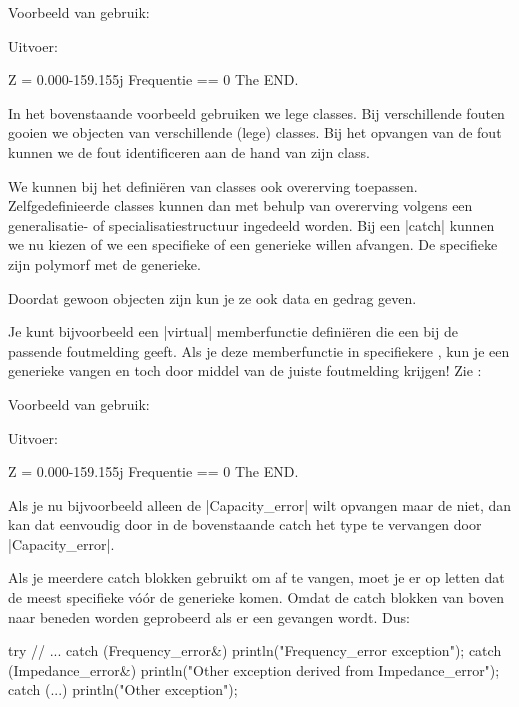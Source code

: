 \begin{cpplstShortInline}
Voorbeeld van gebruik:

Uitvoer:
\begin{coutput}
Z = 0.000-159.155j
Frequentie == 0
The END.
\end{coutput}

In het bovenstaande voorbeeld gebruiken we lege classes.
Bij verschillende fouten gooien we objecten van verschillende (lege) classes.
Bij het opvangen van de fout kunnen we de fout identificeren aan de hand van zijn class.

We kunnen bij het definiëren van  classes ook overerving toepassen.
Zelfgedefinieerde  classes kunnen dan met behulp van overerving volgens een generalisatie- of specialisatiestructuur ingedeeld worden.
Bij een |catch| kunnen we nu kiezen of we een specifieke of een generieke  willen afvangen.
De specifieke zijn polymorf met de generieke.

Doordat  gewoon objecten zijn kun je ze ook data en gedrag geven.

Je kunt bijvoorbeeld een |virtual| memberfunctie definiëren die een bij de  passende foutmelding geeft.
Als je deze memberfunctie in specifiekere  , kun je een generieke  vangen en toch door middel van  de juiste foutmelding krijgen! Zie :


Voorbeeld van gebruik:

Uitvoer:
\begin{coutput}
Z = 0.000-159.155j
Frequentie == 0
The END.
\end{coutput}

Als je nu bijvoorbeeld alleen de |Capacity_error|  wilt opvangen maar de   niet, dan kan dat eenvoudig door in de bovenstaande catch het type  te vervangen door |Capacity_error|.

Als je meerdere catch blokken gebruikt om  af te vangen, moet je er op letten dat de meest specifieke  vóór de generieke  komen.
Omdat de catch blokken van boven naar beneden worden geprobeerd als er een  gevangen wordt.
Dus:
\begin{cpplstfragment}
    try {
    //  ...
    } catch (Frequency_error&) {
        println("Frequency_error exception");
    } catch (Impedance_error&) {
        println("Other exception derived from Impedance_error");
    } catch (...) {
        println("Other exception");
    }
\end{cpplstfragment}


\end{cpplstShortInline}
